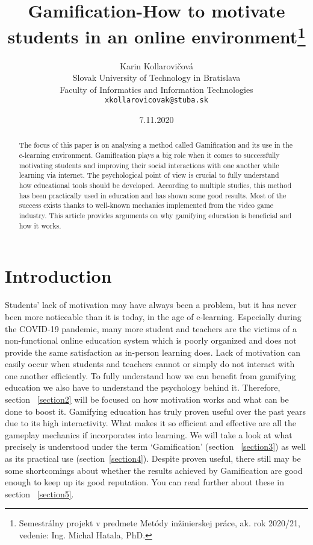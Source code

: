 \documentclass[10pt,english,a4paper]{article}
\title{Gamification-How to motivate students in an online environment\thanks{Semestrálny projekt v predmete Metódy inžinierskej práce, ak. rok 2020/21, vedenie: Ing. Michal Hatala, PhD.}}
\author{Karin Kollarovičová\\[2pt]
	{\small Slovak University of Technology in Bratislava}\\
	{\small Faculty of Informatics and Information Technologies}\\
	{\small \texttt{xkollarovicovak@stuba.sk}}
	}
\date{\small 7.11.2020}
\begin{document}
\maketitle

\begin{abstract}
	The focus of this paper is on analysing a method called Gamification and its use in the e-learning environment. 
	Gamification plays a big role when it comes to successfully motivating students and improving their social interactions with one another while learning via internet. 
	The psychological point of view is crucial to fully understand how educational tools should be developed. 
	According to multiple studies, this method has been practically used in education and has shown some good results. 
	Most of the success exists thanks to well-known mechanics implemented from the video game industry. 
	This article provides arguments on why gamifying education is beneficial and how it works. 
\end{abstract}



\section{Introduction} \label{introduction}
	Students’ lack of motivation may have always been a problem, but it has never been more noticeable than it is today, in the age of e-learning. 
	Especially during the COVID-19 pandemic, many more student and teachers are the victims of a non-functional online education system which is poorly organized and does not provide the same satisfaction as in-person learning does.
	Lack of motivation can easily occur when students and teachers cannot or simply do not interact with one another efficiently. To fully understand how we can benefit from gamifying education we also have to understand the psychology behind it. 
	Therefore, section ~\ref{section2} will be focused on how motivation works and what can be done to boost it.
	Gamifying education has truly proven useful over the past years due to its high interactivity. What makes it so efficient and effective are all the gameplay mechanics if incorporates into learning.
	We will take a look at what precisely is understood under the term ‘Gamification’ (section ~\ref{section3}) as well as its practical use (section~\ref{section4}).
	Despite proven useful, there still may be some shortcomings about whether the results achieved by Gamification are good enough to keep up its good reputation. You can read further about these in section ~\ref{section5}.
\end{document}
